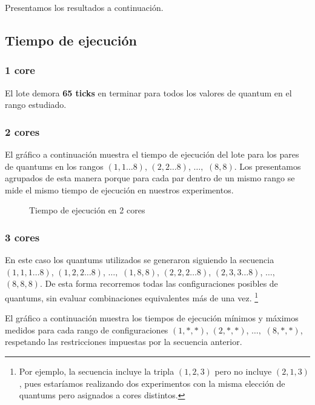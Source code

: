 \documentclass[a4paper,10pt,twoside]{article}
\begin{document}
Presentamos los resultados a continuación.


\subsection{Tiempo de ejecución}


\subsubsection{1 core}

El lote demora \textbf{65 ticks} en terminar para todos los valores de quantum en el rango estudiado.


\subsubsection{2 cores}

El gráfico a continuación muestra el tiempo de ejecución del lote para los pares de quantums en los rangos $(1, 1 \ldots 8)$, $(2, 2 \ldots 8)$, $\ldots,$ $(8, 8)$. Los presentamos agrupados de esta manera porque para cada par dentro de un mismo rango se mide el mismo tiempo de ejecución en nuestros experimentos.

\begin{figure}[H]
	\centering
	
	\caption{Tiempo de ejecución en 2 cores}
\end{figure}


\subsubsection{3 cores}

En este caso los quantums utilizados se generaron siguiendo la secuencia $(1, 1, 1 \ldots 8)$, $(1, 2, 2 \ldots 8)$, $\ldots ,$ $(1, 8, 8)$, $(2, 2, 2 \ldots 8)$, $(2, 3, 3 \ldots 8)$, $\ldots ,$ $(8, 8, 8)$. De esta forma recorremos todas las configuraciones posibles de quantums, sin evaluar combinaciones equivalentes más de una vez. \footnote{Por ejemplo, la secuencia incluye la tripla $(1, 2, 3)$ pero no incluye $(2, 1, 3)$, pues estaríamos realizando dos experimentos con la misma elección de quantums pero asignados a cores distintos.}

El gráfico a continuación muestra los tiempos de ejecución mínimos y máximos medidos para cada rango de configuraciones $(1, *, *)$, $(2, *, *)$, $\ldots ,$ $(8, *, *)$, respetando las restricciones impuestas por la secuencia anterior.
\end{document}
